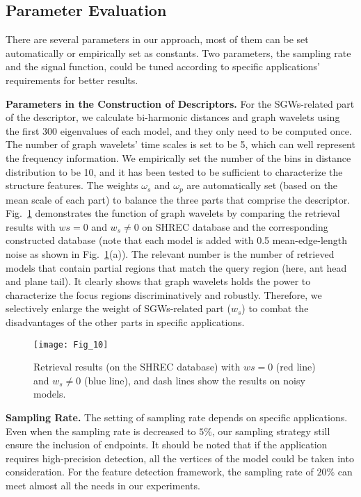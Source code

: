 \subsection{Parameter Evaluation}

There are several parameters in our approach, most of them can be set
automatically or empirically set as constants. Two parameters, the
sampling rate and the signal function, could be tuned according to
specific applications' requirements for better results.

\textbf{Parameters in the Construction of Descriptors.} For the
SGWs-related part of the descriptor, we calculate bi-harmonic
distances and graph wavelets using the first 300 eigenvalues of each
model, and they only need to be computed once. The number of graph
wavelets' time scales is set to be 5, which can well represent the
frequency information. We empirically set the number of the bins in
distance distribution to be 10, and it has been tested to be
sufficient to characterize the structure features. The weights
$\omega_s$ and $\omega_p$ are automatically set (based on the mean
scale of each part) to balance the three parts that comprise the
descriptor. Fig.~\ref{ws} demonstrates the function of graph
wavelets by comparing the retrieval results with $ws = 0$ and
$w_s \neq 0$ on SHREC database and the corresponding constructed
database (note that each model is added with 0.5 mean-edge-length
noise as shown in Fig.~\ref{ws}(a)). The relevant number is the
number of retrieved models that contain partial regions that match
the query region (here, ant head and plane tail). It clearly shows
that graph wavelets holds the power to characterize the focus regions
discriminatively and robustly. Therefore, we selectively enlarge the
weight of SGWs-related part ($w_s$) to combat the disadvantages of
the other parts in specific applications.

\begin{figure}[!to]
\texttt{[image: Fig\_10]}
\caption[Retrieval results on the SHREC database.]
    {Retrieval results (on the SHREC database) with $ws = 0$ (red line)
    and $w_s \neq 0$ (blue line), and dash lines show the results on
    noisy models.}
\label{ws}
\end{figure}

\textbf{Sampling Rate.} The setting of sampling rate depends on
specific applications. Even when the sampling rate is decreased to
$5\%$, our sampling strategy still ensure the inclusion of endpoints.
It should be noted that if the application requires high-precision
detection, all the vertices of the model could be taken into
consideration. For the feature detection framework, the sampling rate
of $20\%$ can meet almost all the needs in our experiments.

